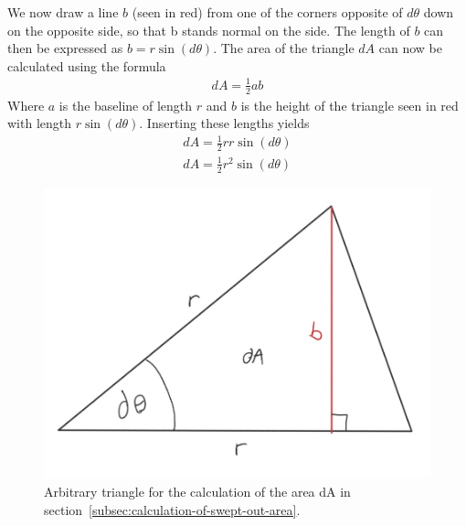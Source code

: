 \documentclass[reprint,english,notitlepage]{revtex4-2}
\begin{document}
	We now draw a line $b$ (seen in red) from one of the corners opposite of $d\theta$ down on the opposite side, so that b stands normal on the side.
	The length of $b$ can then be expressed as $b = r \sin\left(d\theta\right)$.
	The area of the triangle $dA$ can now be calculated using the formula
	\begin{align*}
		dA = \frac{1}{2} a b
	\end{align*}
	Where $a$ is the baseline of length $r$ and $b$ is the height of the triangle seen in red with length $r \sin\left(d\theta\right)$.
	Inserting these lengths yields
	\begin{align*}
	    dA = \frac{1}{2} r r \sin\left(d\theta\right)\\
		dA = \frac{1}{2} r^2 \sin\left(d\theta\right)
	\end{align*}


\begin{figure}[h]
	\centering
	\includegraphics[scale=0.4]{Figures/triangle_sas}
	\caption{Arbitrary triangle for the calculation of the area dA in section~\ref{subsec:calculation-of-swept-out-area}.}\label{fig:triangle_sas}
\end{figure}


\newpage
\end{document}

